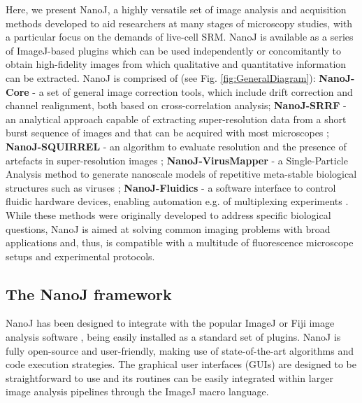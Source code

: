  Here, we present NanoJ, a highly versatile set of image analysis and acquisition methods developed to aid researchers at many stages of microscopy studies, with a particular focus on the demands of live-cell SRM. NanoJ is available as a series of ImageJ-based plugins which can be used independently or concomitantly to obtain high-fidelity images from which qualitative and quantitative information can be extracted. NanoJ is comprised of (see Fig. \ref{fig:GeneralDiagram}): \textbf{NanoJ-Core} - a set of general image correction tools, which include drift correction and channel realignment, both based on cross-correlation analysis; \textbf{NanoJ-SRRF} - an analytical approach capable of extracting super-resolution data from a short burst sequence of images and that can be acquired with most microscopes \cite{gustafsson2016fast,culley2018srrf}; \textbf{NanoJ-SQUIRREL} - an algorithm to evaluate resolution and the presence of artefacts in super-resolution images \cite{culley2018quantitative}; \textbf{NanoJ-VirusMapper} - a Single-Particle Analysis method to generate nanoscale models of repetitive meta-stable biological structures such as viruses \cite{Gray2016,Gray2017,gray2018nanoscale}; \textbf{NanoJ-Fluidics} - a software interface to control fluidic hardware devices, enabling automation e.g. of multiplexing experiments \cite{almada2018automating}. While these methods were originally developed to address specific biological questions, NanoJ is aimed at solving common imaging problems with broad applications and, thus, is compatible with a multitude of fluorescence microscope setups and experimental protocols. 
 
\subsection*{The NanoJ framework}
 NanoJ has been designed to integrate with the popular ImageJ or Fiji image analysis software \cite{abramoff2004image,schindelin2012fiji}, being easily installed as a standard set of plugins. NanoJ is fully open-source and user-friendly, making use of state-of-the-art algorithms and code execution strategies. The graphical user interfaces (GUIs) are designed to be straightforward to use and its routines can be easily integrated within larger image analysis pipelines through the ImageJ macro language.


